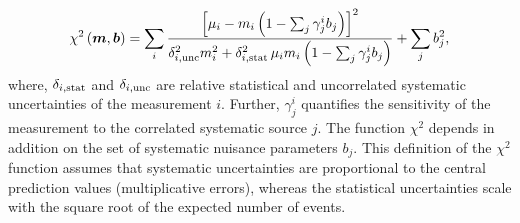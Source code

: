 \begin{description}
\begin{equation} 
    \chi^2\left(\boldsymbol{m},\boldsymbol{b}\right) =   
 \sum_i \frac{\left[ {\mu_i} - m_i \left( 1 - \sum_j \gamma^i_j b_j \right) \right]^2}
{ \textstyle \delta^2_{i,{\rm unc}}m_i^2 + \delta^2_{i,{\rm stat}}\, {\mu_i} m_i \left(1 - \sum_j \gamma^i_j b_j\right) }
  + \sum_j b^2_j,
\label{eq:aven}
\end{equation}
%
where, $\delta_{i,\rm stat}$ and $\delta_{i,\rm unc}$ are 
relative statistical and uncorrelated systematic uncertainties
of the measurement $i$.
Further, $\gamma^i_j$ quantifies the sensitivity of the
measurement to the correlated systematic source $j$. 
The function $\chi^2$ depends in addition on
 the set of systematic nuisance parameters $b_j$.
This definition of the $\chi^2$ function assumes that
systematic uncertainties are proportional to the central prediction values
(multiplicative errors), whereas the statistical uncertainties scale 
with the square root of the expected number of events. 


\end{description}
